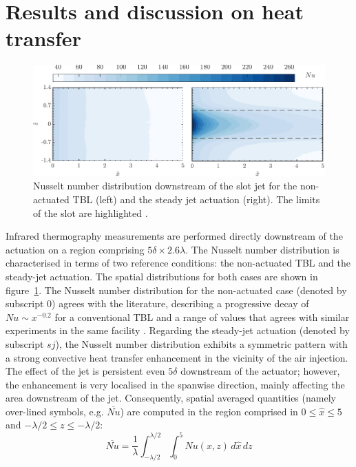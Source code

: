 \section{Results and discussion on heat transfer \label{s:Results}}

\begin{figure}[]
\centering
    \includegraphics*[width=0.99\linewidth]{figures/F2.pdf}
\caption{\label{fig:Numaps} Nusselt number distribution downstream of the slot jet for the non-actuated TBL (left) and the steady jet actuation (right). The limits of the slot are highlighted .} 
\end{figure}

Infrared thermography measurements are performed directly downstream of the actuation on a region comprising $5\delta \times 2.6\lambda$.
The Nusselt number distribution is characterised in terms of two reference conditions: the non-actuated TBL and the steady-jet actuation. The spatial distributions for both cases are shown in figure~\ref{fig:Numaps}. The Nusselt number distribution for the non-actuated case (denoted by subscript $0$) agrees with the literature, describing a progressive decay of $Nu \sim x^{-0.2}$ for a conventional TBL \citep{Lienhard2020} and a range of values that agrees with similar experiments in the same facility \citep{mallor2018cubes}. Regarding the steady-jet actuation (denoted by subscript $sj$), the Nusselt number distribution exhibits a symmetric pattern with a strong convective heat transfer enhancement in the vicinity of the air injection. The effect of the jet is persistent even $5\delta$ downstream of the actuator; however, the enhancement is very localised in the spanwise direction, mainly affecting the area downstream of the jet. Consequently, spatial averaged quantities (namely over-lined symbols, e.g. $\overline{Nu}$) are computed in the region comprised in $0\leq \hat{x} \leq 5$ and $-\lambda/2 \leq z \leq -\lambda/2$: 
%
\begin{equation} \label{eq:Num}
    \overline{Nu} = \frac{1}{\lambda} \int_{-\lambda/2}^{\lambda/2} \int_{0}^{5} Nu(x,z) \,d\hat{x}\,dz
\end{equation}

